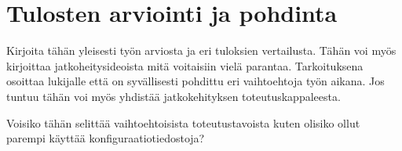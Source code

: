 \chapter{Tulosten arviointi ja pohdinta}
\begin{it}
Kirjoita tähän yleisesti työn arviosta ja eri tuloksien vertailusta. Tähän voi myös kirjoittaa jatkoheitysideoista mitä voitaisiin vielä parantaa. Tarkoituksena osoittaa lukijalle että on syvällisesti pohdittu eri vaihtoehtoja työn aikana. Jos tuntuu tähän voi myös yhdistää jatkokehityksen toteutuskappaleesta.

Voisiko tähän selittää vaihtoehtoisista toteutustavoista kuten olisiko ollut parempi käyttää konfiguraatiotiedostoja?
\end{it}
